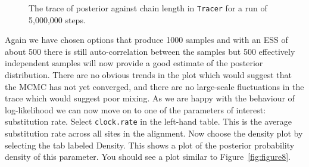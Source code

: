 \documentclass[cup7b, english]{cupbook}
\begin{document}
\begin{figure}[htbp]
\begin{center}
\leavevmode
{}
\end{center}
\caption{The trace of posterior against chain length in \texttt{Tracer} for a run of 5,000,000 steps.}
\label{fig:figure7}
\end{figure}

Again we have chosen options that produce 1000 samples and with an ESS
of about 500 there is still auto-correlation between the samples but 500 effectively independent
samples will now provide a good estimate of the posterior distribution. There are no obvious trends
in the plot which would suggest that the MCMC has not yet converged, and there are no large-scale fluctuations in the 
trace which would suggest poor mixing.
As we are happy with the behaviour of log-likelihood we can now move on to one of the
parameters of interest: substitution rate. Select \texttt{clock.rate} in the left-hand table. This
is the average substitution rate across all sites in the alignment. Now choose the density plot by selecting
the tab labeled Density. This shows a plot of the posterior probability density of this
parameter. You should see a plot similar to Figure~\ref{fig:figure8}.
\end{document}

